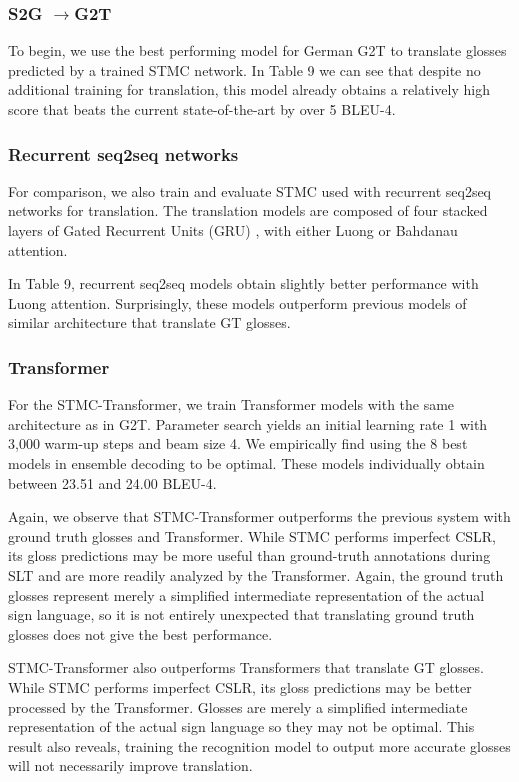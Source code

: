 \documentclass[11pt]{article}
\begin{document}
\subsubsection*{ S2G $\rightarrow $G2T}

To begin, we use the best performing model for German G2T to translate glosses predicted by a trained STMC network. In Table 9 we can see that despite  no additional training for translation, this model already obtains a relatively high score that beats the current state-of-the-art by over 5 BLEU-4. 

\subsubsection*{Recurrent seq2seq networks}
For comparison, we also train and evaluate STMC used with recurrent seq2seq networks for translation. The translation models are composed of four stacked layers of Gated Recurrent Units (GRU) \cite{gru}, with either Luong \cite{luong} or Bahdanau \cite{bahdanau} attention.

In Table 9, recurrent seq2seq models obtain slightly better performance with Luong attention. Surprisingly, these models outperform previous models of similar architecture that translate GT glosses.


\subsubsection*{Transformer}

For the STMC-Transformer, we train Transformer models with the same architecture as in G2T. Parameter search yields an initial learning rate 1 with 3,000 warm-up steps and beam size 4. We empirically find using the 8 best models in ensemble decoding to be optimal. These models individually obtain between 23.51 and 24.00 BLEU-4.

Again, we observe that STMC-Transformer outperforms the previous system with ground truth glosses and Transformer. While STMC performs imperfect CSLR, its gloss predictions may be more useful than ground-truth annotations during SLT and are more readily analyzed by the Transformer. Again, the ground truth glosses represent merely a simplified intermediate representation of the actual sign language, so it is not entirely unexpected that translating ground truth glosses does not give the best performance.

STMC-Transformer also outperforms Transformers that translate GT glosses. While STMC performs imperfect CSLR, its gloss predictions may be better processed by the Transformer. Glosses are merely a simplified intermediate representation of the actual sign language so they may not be optimal. This result also reveals, training the recognition model to output more accurate glosses will not necessarily improve translation.
\end{document}
